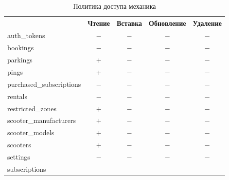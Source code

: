 \begin{table}[H]
	\begin{threeparttable}[b]
		\caption{Политика доступа механика}
		\label{tbl:technician-policy}
		{\renewcommand{\arraystretch}{1.2}
			\begin{tabularx}{\textwidth}
				{
					| >{\raggedright\arraybackslash}X
					| >{\centering\arraybackslash}c
					| >{\centering\arraybackslash}c
					| >{\centering\arraybackslash}c
					| >{\centering\arraybackslash}c |
				}
				\hline
				                         & \textbf{Чтение}     & \textbf{Вставка} & \textbf{Обновление} & \textbf{Удаление} \\
				\hline
				auth\_tokens             & $-$                 & $-$              & $-$                 & $-$               \\
				\hline
				bookings                 & $-$                 & $-$              & $-$                 & $-$               \\
				\hline
				parkings                 & $+$                 & $-$              & $-$                 & $-$               \\
				\hline
				pings                    & $+$\rlap{\tnote{1}} & $-$              & $-$                 & $-$               \\
				\hline
				purchased\_subscriptions & $-$                 & $-$              & $-$                 & $-$               \\
				\hline
				rentals                  & $-$                 & $-$              & $-$                 & $-$               \\
				\hline
				restricted\_zones        & $+$                 & $-$              & $-$                 & $-$               \\
				\hline
				scooter\_manufacturers   & $+$                 & $-$              & $-$                 & $-$               \\
				\hline
				scooter\_models          & $+$                 & $-$              & $-$                 & $-$               \\
				\hline
				scooters                 & $+$                 & $-$              & $-$                 & $-$               \\
				\hline
				settings                 & $-$                 & $-$              & $-$                 & $-$               \\
				\hline
				subscriptions            & $-$                 & $-$              & $-$                 & $-$               \\

\end{tabularx}}
\end{threeparttable}
\end{table}
